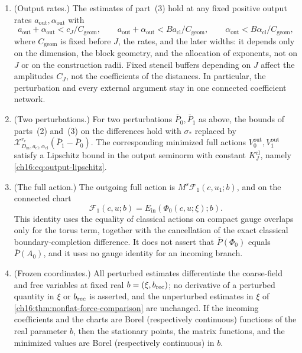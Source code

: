 \begin{theorem}
\begin{enumerate}
\[
 \partial_\lambda z_{I,\lambda}
    =-\mathcal Q_{\lambda,II}^{-1}V_I,
\]
where $V_I$ is the $I$-component of the gradient of $z\mapsto\overline P(\Phi_0(c,S_0^{-1}(z-z_0);\xi);b)$. Along the successive chain this derivative contains the additional term $-\mathcal Q_{\lambda,II}^{-1}\mathcal Q_{\lambda,II^c}\partial_\lambda z_{I^c}$ and the full derivative $(\partial_\lambda K_{\lambda,i}^{-1/2})q_i$. The function $V=\overline P\circ\Phi_0$ satisfies $\|V_u\|\le C_J\sigma_*\rho_{\mathrm{cl}}$ and $\|V_{uu}\|\le C_J\sigma_*$; the term $\overline P'\Phi_{0,uu}$ is kept in the second derivative.
\item (Output rates.) The estimates of part~(3) hold at any fixed positive output rates $a_{\mathrm{out}},\alpha_{\mathrm{out}}$ with
\[
 a_{\mathrm{out}}+\alpha_{\mathrm{out}}<c_J/C_{\mathrm{geom}},\qquad
 a_{\mathrm{out}}+\alpha_{\mathrm{out}}
                   <B a_{\mathrm{cl}}/C_{\mathrm{geom}},\qquad
 \alpha_{\mathrm{out}}<B\alpha_{\mathrm{cl}}/C_{\mathrm{geom}},
\]
where $C_{\mathrm{geom}}$ is fixed before $J$, the rates, and the later widths: it depends only on the dimension, the block geometry, and the allocation of exponents, not on $J$ or on the construction radii. Fixed stencil buffers depending on $J$ affect the amplitudes $C_J$, not the coefficients of the distances. In particular, the perturbation and every external argument stay in one connected coefficient network.
\item (Two perturbations.) For two perturbations $\overline P_0,\overline P_1$ as above, the bounds of parts~(2) and~(3) on the differences hold with $\sigma_*$ replaced by $\mathcal X_{D_{\mathrm{in}},a_{\mathrm{cl}},\alpha_{\mathrm{cl}}}^{r_c}(\overline P_1-\overline P_0)$. The corresponding minimized full actions $V^{\mathrm{out}}_0,V^{\mathrm{out}}_1$ satisfy a Lipschitz bound in the output seminorm with constant $K_J^{\mathrm{cl}}$, namely \eqref{ch16:eq:output-lipschitz}.
\item (The full action.) The outgoing full action is $M^s\mathcal F_1(c,u_1;b)$, and on the connected chart
\[
 \mathcal F_1(c,u;b)=E_{\mathrm{in}}(\Phi_0(c,u;\xi);b).
\]
This identity uses the equality of classical actions on compact gauge overlaps only for the torus term, together with the cancellation of the exact classical boundary-completion difference. It does not assert that $\overline P(\Phi_0)$ equals $\overline P(A_0)$, and it uses no gauge identity for an incoming branch.
\item (Frozen coordinates.) All perturbed estimates differentiate the coarse-field and free variables at fixed real $b=(\xi,b_{\mathrm{rec}})$; no derivative of a perturbed quantity in $\xi$ or $b_{\mathrm{rec}}$ is asserted, and the unperturbed estimates in $\xi$ of \cref{ch16:thm:nonflat-force-comparison} are unchanged. If the incoming coefficients and the charts are Borel (respectively continuous) functions of the real parameter $b$, then the stationary points, the matrix functions, and the minimized values are Borel (respectively continuous) in $b$.

\end{enumerate}
\end{theorem}
